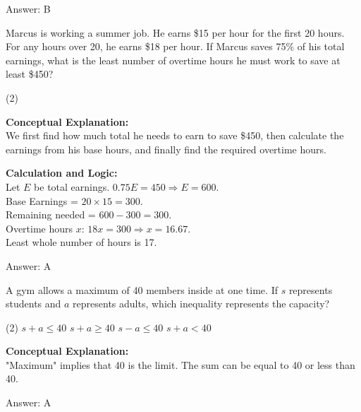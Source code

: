 \documentclass[11pt,paper=a4,answers]{exam}
\begin{document}
\begin{questions}
\begin{solution}
\vspace{15pt}
Answer: \colorbox{yellow!100}{B}
\end{solution}

\question
Marcus is working a summer job. He earns \$15 per hour for the first 20 hours. For any hours over 20, he earns \$18 per hour. If Marcus saves 75\% of his total earnings, what is the least number of overtime hours he must work to save at least \$450?
\begin{tasks}(2)
\end{tasks}

\begin{solution}
\textbf{Conceptual Explanation:} \\
We first find how much total he needs to earn to save \$450, then calculate the earnings from his base hours, and finally find the required overtime hours.

\vspace{10pt}
\textbf{Calculation and Logic:} \\
Let $E$ be total earnings. $0.75E = 450 \Rightarrow E = 600$. \\
Base Earnings = $20 \times 15 = 300$. \\
Remaining needed = $600 - 300 = 300$. \\
Overtime hours $x$: $18x = 300 \Rightarrow x = 16.67$. \\
Least whole number of hours is 17.

\vspace{15pt}
Answer: \colorbox{yellow!100}{A}
\end{solution}

\question
A gym allows a maximum of 40 members inside at one time. If $s$ represents students and $a$ represents adults, which inequality represents the capacity?
\begin{tasks}(2)
    \task $s + a \le 40$
    \task $s + a \ge 40$
    \task $s - a \le 40$
    \task $s + a < 40$
\end{tasks}

\begin{solution}
\textbf{Conceptual Explanation:} \\
"Maximum" implies that 40 is the limit. The sum can be equal to 40 or less than 40.

\vspace{15pt}
Answer: \colorbox{yellow!100}{A}
\end{solution}


\end{questions}
\end{document}
